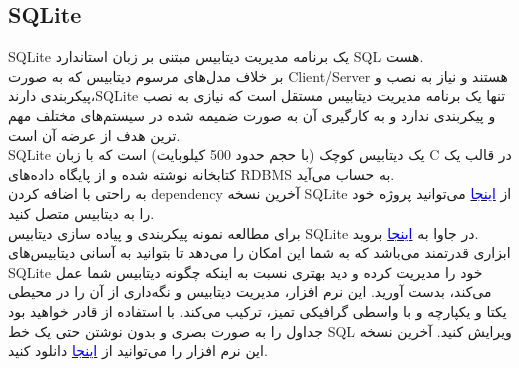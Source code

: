 \documentclass[]{article}
\newcommand{\link}[2]{\href{#1}{\textcolor{blue}{#2}}}
\begin{document}
\subsection*{{\titr SQLite}}
SQLite یک برنامه مدیریت دیتابیس مبتنی بر زبان استاندارد SQL هست.\\
بر خلاف مدل‌های مرسوم دیتابیس که به صورت Client/Server هستند و نیاز به نصب و پیکربندی دارند‌،SQLite  تنها یک برنامه مدیریت دیتابیس مستقل است که نیازی به نصب و پیکربندی ندارد و به کارگیری آن به صورت ضمیمه شده در سیستم‌های مختلف مهم ترین هدف از عرضه آن است.\\
SQLite یک دیتابیس کوچک (با حجم حدود 500 کیلوبایت) است که با زبان C در قالب یک کتابخانه نوشته شده و از پایگاه داده‌های RDBMS به حساب می‌آید.\\
به راحتی با اضافه کردن dependency آخرین نسخه SQLite از \link{https://mvnrepository.com/artifact/org.xerial/sqlite-jdbc}{اینجا} می‌توانید پروژه خود را به دیتابیس متصل کنید.\\
برای مطالعه نمونه پیکربندی و پیاده سازی دیتابیس SQLite در جاوا به \link{https://www.sqlitetutorial.net/sqlite-java/}{اینجا} بروید.\\
 ابزاری قدرتمند می‌باشد که به شما این امکان را می‌دهد تا بتوانید به آسانی دیتابیس‌های SQLite خود را مدیریت کرده و دید بهتری نسبت به اینکه چگونه دیتابیس شما عمل می‌کند، بدست آورید. این نرم افزار، مدیریت دیتابیس و نگه‌داری از آن را در محیطی یکتا و یکپارچه و با واسطی گرافیکی تمیز، ترکیب می‌کند. با استفاده از  قادر خواهید بود جداول را به صورت بصری و بدون نوشتن حتی یک خط SQL ویرایش کنید. آخرین نسخه این نرم افزار را می‌توانید از \link{https://soft98.ir/software/programming/15259-SQLite-Expert.html}{اینجا} دانلود کنید.
\end{document}
